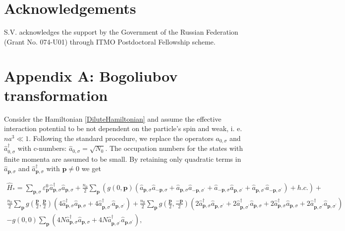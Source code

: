 \documentclass[reprint,superscriptaddress,showpacs,nofootinbib,aps,pra]{revtex4-1}
\begin{document}
\section{Acknowledgements}

S.V. acknowledges the support by the Government of the Russian Federation (Grant No. 074-U01) through ITMO Postdoctoral Fellowship scheme.                       

\section*{Appendix A: Bogoliubov transformation}

Consider the Hamiltonian \eqref{DiluteHamiltonian} and assume the effective interaction potential to be not dependent on the particle's spin and weak, i. e. $na^3\ll 1$. Following the standard procedure, we replace the operators $\hat{a}_{0, \sigma}$ and $\hat a^\dag_{0, \sigma}$ with c-numbers: $\hat{a}_{0, \sigma} = \sqrt{N_0}$. The occupation numbers for the states with finite momenta are assumed to be small. By retaining only quadratic terms in $\hat{a}_{\bm p, \sigma}$ and $\hat a^\dag_{\bm p, \sigma}$ with $\bm p \neq 0$ we get
\begin{widetext}
\begin{equation*}
 \begin{aligned}
\hat{H}_{\ast}=\sum_{{\bm p},\sigma}\varepsilon_{\bm p}^0 \hat{a}_{{\bm p},\sigma}^{\dag}    	
  \hat{a}_{{\bm p},\sigma}+
  \frac{n_0}{2} \sum_{{\bm p}} \left(  g(0,{\bm p}) (\hat{a}_{{\bm p},\sigma}\hat{a}_{\bm{-p},\sigma} +  \hat{a}_{{\bm p},\sigma}\hat{a}_{\bm{-p},\sigma^\prime} +\hat{a}_{\bm{-p},\sigma}\hat{a}_{{\bm p},\sigma^\prime}  + \hat{a}_{{\bm p},\sigma^\prime}\hat{a}_{\bm{-p},\sigma^\prime}) + h.c. \right) + \\ 
\frac{n_0}{2} \sum_{{\bm p}} g(\tfrac{{\bm p}}2,\tfrac{{\bm p}}2)( 4 \hat{a}_{{\bm p},\sigma}^{\dag} \hat{a}_{{\bm p},\sigma} + 4 \hat{a}_{{\bm p},\sigma^\prime}^{\dag} \hat{a}_{{\bm p},\sigma^\prime})
+\frac{n_0}{2} \sum_{{\bm p}} g(\tfrac{{\bm p}}2,\tfrac{\bm{-p}}2)( 2\hat{a}_{{\bm p},\sigma}^{\dag} \hat{a}_{{\bm p},\sigma^\prime} + 2\hat{a}_{{\bm p},\sigma^\prime}^{\dag} \hat{a}_{{\bm p},\sigma} + 2\hat{a}_{{\bm p},\sigma}^{\dag} \hat{a}_{{\bm p},\sigma} + 2 \hat{a}_{{\bm p},\sigma^\prime}^{\dag} \hat{a}_{{\bm p},\sigma^\prime} ) \\ - g(0,0) \sum_{{\bm p}} ( 4N \hat{a}_{{\bm p},\sigma}^{\dag} \hat{a}_{{\bm p},\sigma} + 4N \hat{a}_{{\bm p},\sigma^\prime}^{\dag} \hat{a}_{{\bm p}.\sigma^\prime} ),
 \end{aligned}
\end{equation*}
\end{widetext}
\end{document}
